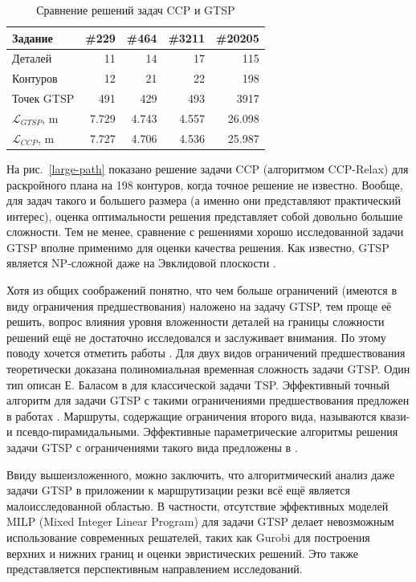 \documentclass[10pt]{SPIIRAS_Proceedings}
\begin{document}
\begin{table}[h]
  \begin{center}
  \begin{tabular}{l*{4}{|r}}
      Задание & \#229 & \#464 & \#3211 & \#20205 \\
      \hline \hline
      Деталей & 11 & 14 & 17 & 115 \\
      \hline
      Контуров & 12 & 21 & 22 & 198 \\
      \hline
      Точек GTSP & 491 & 429 & 493 & 3917 \\
      \hline
      $\mathcal L_{GTSP}$, m & 7.729 & 4.743 & 4.557 & 26.098 \\
      \hline
      $\mathcal L_{CCP}$, m & 7.727 & 4.706 & 4.536 & 25.987 \\
      \hline
  \end{tabular}
  \caption{Сравнение решений задач CCP и GTSP}
  \label{ccp-vs-gtsp}
  \end{center}
\end{table}

На рис.~\ref{large-path}
показано решение задачи CCP
(алгоритмом CCP-Relax)
для раскройного плана на 198 контуров,
когда точное решение не известно.
Вообще,
для задач такого и большего размера
(а именно они представляют практический интерес),
оценка оптимальности решения
представляет собой довольно большие сложности.
Тем не менее,
сравнение с решениями
хорошо исследованной задачи GTSP
вполне применимо для оценки качества решения.
Как известно,
GTSP является NP-сложной
даже на Эвклидовой плоскости
\cite{bib:x103}.

Хотя из общих соображений понятно,
что чем больше ограничений
(имеются в виду ограничения предшествования)
наложено на задачу GTSP,
тем проще её решить,
вопрос влияния уровня вложенности деталей
на границы сложности решений ещё
не достаточно исследовался и заслуживает внимания.
По этому поводу хочется отметить работы
\cite{bib:x104,bib:x105}.
Для двух видов ограничений предшествования
теоретически доказана полиномиальная временная сложность
задачи GTSP.
Один тип описан Е. Баласом в
\cite{bib:x100}
для классической задачи TSP.
Эффективный точный алгоритм для задачи GTSP
с такими ограничениями предшествования
предложен в работах
\cite{bib:x102,ChentsovIII}.
Маршруты,
содержащие ограничения второго вида,
называются квази- и псевдо-пирамидальными.
Эффективные параметрические алгоритмы
решения задачи GTSP
с ограничениями такого вида предложены в
\cite{KhachaiI,KhachayII}.

Ввиду вышеизложенного,
можно заключить,
что алгоритмический анализ
даже задачи GTSP
в приложении к маршрутизации резки
всё ещё является малоисследованной областью.
В частности,
отсутствие эффективных моделей
MILP (Mixed Integer Linear Program)
для задачи GTSP
делает невозможным использование
современных решателей,
таких как Gurobi
\cite{bib:x101}
для построения верхних и нижних границ
и оценки эвристических решений.
Это также представляется перспективным
направлением исследований.
\end{document}
